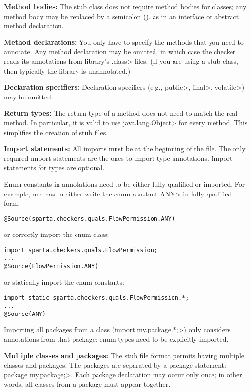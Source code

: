 \begin{description}

\item{\textbf{Method bodies:}}
  The stub class does not require method bodies for classes; any method
  body may be replaced by a semicolon (\code{;}), as in an interface or
  abstract method declaration.

\item{\textbf{Method declarations:}}
  You only have to specify the methods that you need to annotate.
  Any method declaration may be omitted, in which case the checker reads
  its annotations from library's \<.class> files.  (If you are using a stub class, then
  typically the library is unannotated.)

\item{\textbf{Declaration specifiers:}}
  Declaration specifiers (e.g., \<public>, \<final>, \<volatile>)
  may be omitted.

\item{\textbf{Return types:}}
  The return type of a method does not need to match the real method.
  In particular, it is valid to use \<java.lang.Object> for every method.
  This simplifies the creation of stub files.

\item{\textbf{Import statements:}}
  All imports must be at the beginning of the file.
  The only required import statements are the ones to import type
  annotations.  Import statements for types are optional.

  Enum constants in annotations need to be either fully qualified
  or imported.
  For example, one has to either write the enum constant \<ANY> in
  fully-qualified form:

\begin{Verbatim}
@Source(sparta.checkers.quals.FlowPermission.ANY)
\end{Verbatim}

\noindent
or correctly import the enum class:

\begin{Verbatim}
import sparta.checkers.quals.FlowPermission;
...
@Source(FlowPermission.ANY)
\end{Verbatim}

\noindent
or statically import the enum constants:

\begin{Verbatim}
import static sparta.checkers.quals.FlowPermission.*;
...
@Source(ANY)
\end{Verbatim}

  Importing all packages from a class (\<import my.package.*;>) only
  considers annotations from that package; enum types need to be
  explicitly imported.

\item{\textbf{Multiple classes and packages:}}
  The stub file format permits having multiple classes and packages.
  The packages are separated by a package statement:
  \<package my.package;>.  Each package declaration may occur only once; in
  other words, all classes from a package must appear together.

\end{description}



